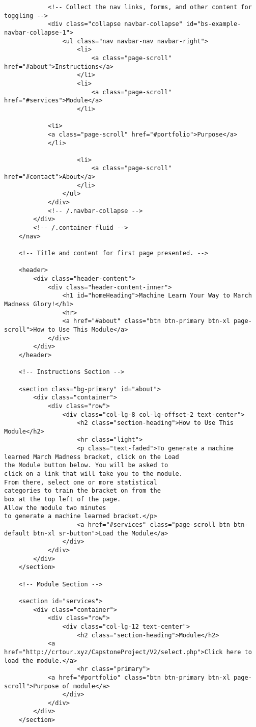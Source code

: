 \documentclass[onecolumn, draftclsnofoot,10pt, compsoc]{IEEEtran}
\begin{document}
\begin{lstlisting}
            <!-- Collect the nav links, forms, and other content for toggling -->
            <div class="collapse navbar-collapse" id="bs-example-navbar-collapse-1">
                <ul class="nav navbar-nav navbar-right">
                    <li>
                        <a class="page-scroll" href="#about">Instructions</a>
                    </li>
                    <li>
                        <a class="page-scroll" href="#services">Module</a>
                    </li>
		
		    <li>
			<a class="page-scroll" href="#portfolio">Purpose</a>
		    </li>

                    <li>
                        <a class="page-scroll" href="#contact">About</a>
                    </li>
                </ul>
            </div>
            <!-- /.navbar-collapse -->
        </div>
        <!-- /.container-fluid -->
    </nav>

	<!-- Title and content for first page presented. -->

    <header>
        <div class="header-content">
            <div class="header-content-inner">
                <h1 id="homeHeading">Machine Learn Your Way to March Madness Glory!</h1>
                <hr>
                <a href="#about" class="btn btn-primary btn-xl page-scroll">How to Use This Module</a>
            </div>
        </div>
    </header>

	<!-- Instructions Section -->

    <section class="bg-primary" id="about">
        <div class="container">
            <div class="row">
                <div class="col-lg-8 col-lg-offset-2 text-center">
                    <h2 class="section-heading">How to Use This Module</h2>
                    <hr class="light">
                    <p class="text-faded">To generate a machine learned March Madness bracket, click on the Load 
the Module button below. You will be asked to 
click on a link that will take you to the module. 
From there, select one or more statistical 
categories to train the bracket on from the 
box at the top left of the page. 
Allow the module two minutes 
to generate a machine learned bracket.</p>
                    <a href="#services" class="page-scroll btn btn-default btn-xl sr-button">Load the Module</a>
                </div>
            </div>
        </div>
    </section>

	<!-- Module Section -->

    <section id="services">
        <div class="container">
            <div class="row">
                <div class="col-lg-12 text-center">
                    <h2 class="section-heading">Module</h2>
			<a href="http://crtour.xyz/CapstoneProject/V2/select.php">Click here to load the module.</a>
                    <hr class="primary">
		    <a href="#portfolio" class="btn btn-primary btn-xl page-scroll">Purpose of module</a>
                </div>
            </div>
        </div>         
	</section>


\end{lstlisting}
\end{document}
